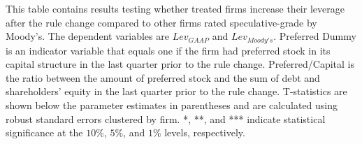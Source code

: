 \documentclass[a4paper, 12pt]{article}
\begin{document}
\begin{table}[htbp]
\caption{\textbf{The Effect of Rule Change on Leverage}
} \label{table_lev_all}
\begin{singlespace}
\begin{small}

\noindent This table contains results testing whether treated firms increase their leverage after the rule change compared to other firms rated speculative-grade by Moody's. The dependent variables are $Lev_{GAAP}$ and $Lev_{Moody's}$. Preferred Dummy is an indicator variable that equals one if the firm had preferred stock in its capital structure in the last quarter prior to the rule change. Preferred/Capital is the ratio between the amount of preferred stock and the sum of debt and shareholders' equity in the last quarter prior to the rule change. T-statistics are shown below the parameter estimates in parentheses and are calculated using robust standard errors clustered by firm. *, **, and *** indicate statistical significance at the $10\%$, $5\%$, and $1\%$ levels, respectively.

\end{small}
\end{singlespace}
\vspace{3mm}
\small
  \centering
\end{table}


\clearpage

\newpage
\end{document}
